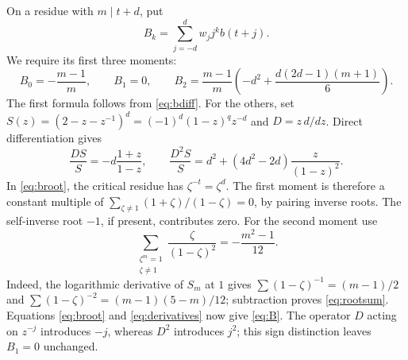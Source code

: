 \documentclass[11pt,reqno]{amsart}
\theoremstyle{remark}
\begin{document}
On a residue with \(m\mid t+d\), put
\[
 B_k=\sum_{j=-d}^{d}w_jj^k b(t+j).
\]
We require its first three moments:
\begin{equation}\label{eq:B}
 B_0=-\frac{m-1}{m},\qquad B_1=0,\qquad
 B_2=\frac{m-1}{m}
       \left(-d^2+\frac{d(2d-1)(m+1)}6\right).
\end{equation}
The first formula follows from \eqref{eq:bdiff}.
For the others, set
\(S(z)=(2-z-z^{-1})^d=(-1)^d(1-z)^qz^{-d}\) and
\(D=z\,d/dz\). Direct differentiation gives
\begin{equation}\label{eq:derivatives}
 \frac{DS}{S}=-d\frac{1+z}{1-z},
 \qquad
 \frac{D^2S}{S}=d^2+(4d^2-2d)\frac{z}{(1-z)^2}.
\end{equation}
In \eqref{eq:broot}, the critical residue has \(\zeta^{-t}=\zeta^d\).
The first moment is therefore a constant multiple of
\(\sum_{\zeta\ne1}(1+\zeta)/(1-\zeta)=0\), by pairing inverse roots.
The self-inverse root \(-1\), if present, contributes zero.
For the second moment use
\begin{equation}\label{eq:rootsum}
 \sum_{\substack{\zeta^m=1\\\zeta\ne1}}\frac{\zeta}{(1-\zeta)^2}
       =-\frac{m^2-1}{12}.
\end{equation}
Indeed, the logarithmic derivative of \(S_m\) at \(1\) gives
\(\sum(1-\zeta)^{-1}=(m-1)/2\) and
\(\sum(1-\zeta)^{-2}=(m-1)(5-m)/12\); subtraction proves
\eqref{eq:rootsum}. Equations \eqref{eq:broot} and
\eqref{eq:derivatives} now give \eqref{eq:B}.
The operator \(D\) acting on \(z^{-j}\) introduces \(-j\), whereas \(D^2\)
introduces \(j^2\); this sign distinction leaves \(B_1=0\) unchanged.
\end{document}
